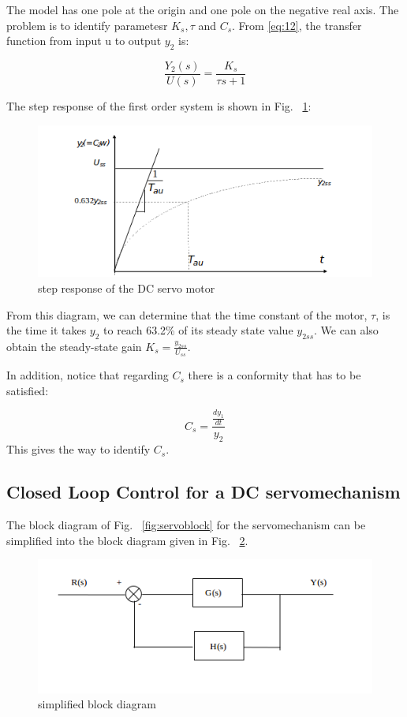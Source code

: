 \documentclass[11pt,a4paper]{article}
\begin{document}
The model has one pole at the origin and one pole on the negative real axis. The problem is to identify parametesr $K_{s}, \tau$ and $C_{s}$. From \ref{eq:12}, the transfer function from input u to output $y_{2}$ is:

\begin{equation} \label{eq:13}
\frac{Y_{2}(s)}{U(s)} = \frac{K_{s}}{\tau s + 1}
\end{equation}

The step response of the first order system is shown in Fig. ~\ref{fig:servostepresp}:

\begin{figure}[here]
\includegraphics[width=\textwidth]{imglab/servostepresponse.png}
\caption{step response of the DC servo motor}
\label{fig:servostepresp}
\end{figure}

From this diagram, we can determine that the time constant of the motor, $\tau$, is the time it takes $y_{2}$ to reach 63.2\% of its steady state value $y_{2ss}$. We can also obtain the steady-state gain $K_{s} = \frac{y_{2ss}}{U_{ss}}$.

In addition, notice that regarding $C_{s}$ there is a conformity that has to be satisfied:

\begin{equation} \label{eq:14}
C_{s} = \frac{\frac{dy_{1}}{dt}}{y_2}
\end{equation}
This gives the way to identify $C_{s}$.

\subsection{Closed Loop Control for a DC servomechanism} \label{ss:closedloop}
The block diagram of Fig. ~\ref{fig:servoblock} for the servomechanism can be simplified into the block diagram given in Fig. ~\ref{fig:servotfblock}.

\begin{figure}[here]
\includegraphics{imglab/servotfblock.png}
\caption{simplified block diagram}
\label{fig:servotfblock}
\end{figure}
\end{document}
